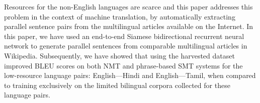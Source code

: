 Resources for the non-English languages are scarce and this paper addresses this problem in the context of machine translation, by automatically extracting parallel sentence pairs from the multilingual articles available on the Internet. In this paper, we have used an end-to-end Siamese bidirectional recurrent neural network to generate parallel sentences from comparable multilingual articles in Wikipedia. Subsequently, we have showed that using the harvested dataset improved BLEU scores on both NMT and phrase-based SMT systems for the low-resource language pairs: English---Hindi and English---Tamil, when compared to training exclusively on the limited bilingual corpora collected for these language pairs.

